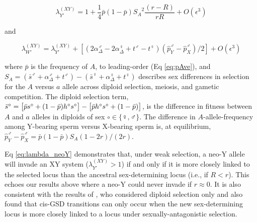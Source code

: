 \documentclass[10pt,letterpaper]{article}
\begin{document}
\begin{equation}
\lambda_{Y'}^{(XY)} = 1 + \frac{1}{4}\bar{p}(1-\bar{p}){S_{A}}^2\frac{ \left( r-R \right) }{r R}+O\left(\epsilon^3 \right) 
\label{eq:lambda_neoY}
\end{equation}

\noindent 
and 

\begin{equation}
\lambda_{W'}^{(XY)} =\lambda_{Y'}^{(XY)}+\left[\left(2\alpha_{\Delta}^\male-2\alpha_{\Delta}^\female+t^\male-t^\female \right) \left( \hat{p}^\male_Y-\hat{p}^\male_X \right)/2\right]
+O\left(\epsilon^3 \right)
\label{eq:lambda_neoW}
\end{equation}

\noindent
where $\bar{p}$ is the frequency of $A$, to leading-order (Eq \ref{eq:pAve}), and $S_{A}=(\bar{s}^\male +\alpha_{\Delta}^\male+t^\male) - (\bar{s}^\female+\alpha_{\Delta}^\female+t^\female)$ describes sex differences in selection for the $A$ versus $a$ allele across diploid selection, meiosis, and gametic competition.
The diploid selection term, $\bar{s}^\circ=\big{[} \bar{p}s^\circ+(1-\bar{p})h^\circ s^\circ\big{]} -\big{[} \bar{p}h^\circ s^\circ+(1-\bar{p}) \big{]}$, is the difference in fitness between $A$ and $a$ alleles in diploids of sex $\circ \in \{\female,\male\}$. 
The difference in $A$-allele-frequency among Y-bearing sperm versus X-bearing sperm is, at equilibrium, $\hat{p}^\male_Y-\hat{p}^\male_X=\bar{p}(1-\bar{p})S_{A}(1-2r)/(2r)$. 

Eq \eqref{eq:lambda_neoY} demonstrates that, under weak selection, a neo-Y allele will invade an XY system ($\lambda_{Y'}^{(XY)}>1$) if and only if it is more closely linked to the selected locus than the ancestral sex-determining locus (i.e., if $R<r$). 
This echoes our results above where a neo-Y could never invade if $r\approx0$. 
It is also consistent with the results of \cite{vanDoorn:2007eu}, who considered diploid selection only and also found that cis-GSD transitions can only occur when the new sex-determining locus is more closely linked to a locus under sexually-antagonistic selection. 
\end{document}
